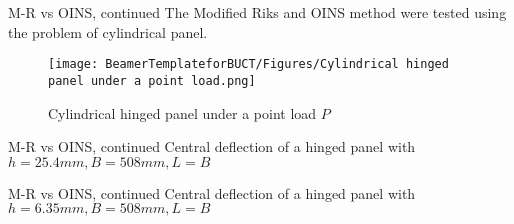 \documentclass[
10pt,
aspectratio=169,
]{beamer}
\begin{document}
\begin{frame}{M-R vs OINS, continued}
    The Modified Riks and OINS method were tested using the problem of cylindrical panel.

    \begin{figure}
        \centering
        \texttt{[image: BeamerTemplateforBUCT/Figures/Cylindrical hinged panel under a point load.png]}
        \caption{Cylindrical hinged panel under a point load \(P\)}
        \label{fig:enter-label}
    \end{figure}
\end{frame}
\begin{frame}{M-R vs OINS, continued}
Central deflection of a hinged panel with \(h = 25.4 mm, B = 508 mm, L = B\)
    \begin{figure}[h]
    \centering
    \hspace{1 pt}
    \end{figure}
\end{frame}
\begin{frame}{M-R vs OINS, continued}
Central deflection of a hinged panel with \(h = 6.35 mm, B = 508 mm, L = B\)
    \begin{figure}[h]
    \centering
    \hspace{1 pt}
    \end{figure}
\end{frame}
\end{document}
